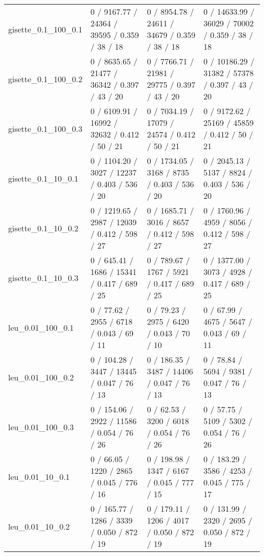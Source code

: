 \begin{tabular}{llll}
       gisette\_0.1\_100\_0.1 &   0 / 9167.77 /  24364 /   39595 / 0.359 /     38 /     18 &   0 / 8954.78 /  24611 /   34679 / 0.359 /     38 /     18 &  0 / 14633.99 /  36029 /   70002 / 0.359 /     38 /     18 \\
       gisette\_0.1\_100\_0.2 &   0 / 8635.65 /  21477 /   36342 / 0.397 /     43 /     20 &   0 / 7766.71 /  21981 /   29775 / 0.397 /     43 /     20 &  0 / 10186.29 /  31382 /   57378 / 0.397 /     43 /     20 \\
       gisette\_0.1\_100\_0.3 &   0 / 6109.91 /  16992 /   32632 / 0.412 /     50 /     21 &   0 / 7034.19 /  17079 /   24574 / 0.412 /     50 /     21 &   0 / 9172.62 /  25169 /   45859 / 0.412 /     50 /     21 \\
        gisette\_0.1\_10\_0.1 &   0 / 1104.20 /   3027 /   12237 / 0.403 /    536 /     20 &   0 / 1734.05 /   3168 /    8735 / 0.403 /    536 /     20 &   0 / 2045.13 /   5137 /    8824 / 0.403 /    536 /     20 \\
        gisette\_0.1\_10\_0.2 &   0 / 1219.65 /   2987 /   12039 / 0.412 /    598 /     27 &   0 / 1685.71 /   3016 /    8657 / 0.412 /    598 /     27 &   0 / 1760.96 /   4959 /    8056 / 0.412 /    598 /     27 \\
        gisette\_0.1\_10\_0.3 &    0 / 645.41 /   1686 /   15341 / 0.417 /    689 /     25 &    0 / 789.67 /   1767 /    5921 / 0.417 /    689 /     25 &   0 / 1377.00 /   3073 /    4928 / 0.417 /    689 /     25 \\
          leu\_0.01\_100\_0.1 &     0 / 77.62 /   2955 /    6718 / 0.043 /     69 /     11 &     0 / 79.23 /   2975 /    6420 / 0.043 /     70 /     10 &     0 / 67.99 /   4675 /    5647 / 0.043 /     69 /     11 \\
          leu\_0.01\_100\_0.2 &    0 / 104.28 /   3447 /   13445 / 0.047 /     76 /     13 &    0 / 186.35 /   3487 /   14406 / 0.047 /     76 /     13 &     0 / 78.84 /   5694 /    9381 / 0.047 /     76 /     13 \\
          leu\_0.01\_100\_0.3 &    0 / 154.06 /   2922 /   11586 / 0.054 /     76 /     26 &     0 / 62.53 /   3200 /    6018 / 0.054 /     76 /     26 &     0 / 57.75 /   5109 /    5302 / 0.054 /     76 /     26 \\
           leu\_0.01\_10\_0.1 &     0 / 66.05 /   1220 /    2865 / 0.045 /    776 /     16 &    0 / 198.98 /   1347 /    6167 / 0.045 /    777 /     15 &    0 / 183.29 /   3586 /    4253 / 0.045 /    775 /     17 \\
           leu\_0.01\_10\_0.2 &    0 / 165.77 /   1286 /    3339 / 0.050 /    872 /     19 &    0 / 179.11 /   1206 /    4017 / 0.050 /    872 /     19 &    0 / 131.99 /   2320 /    2695 / 0.050 /    872 /     19 \\

\end{tabular}
